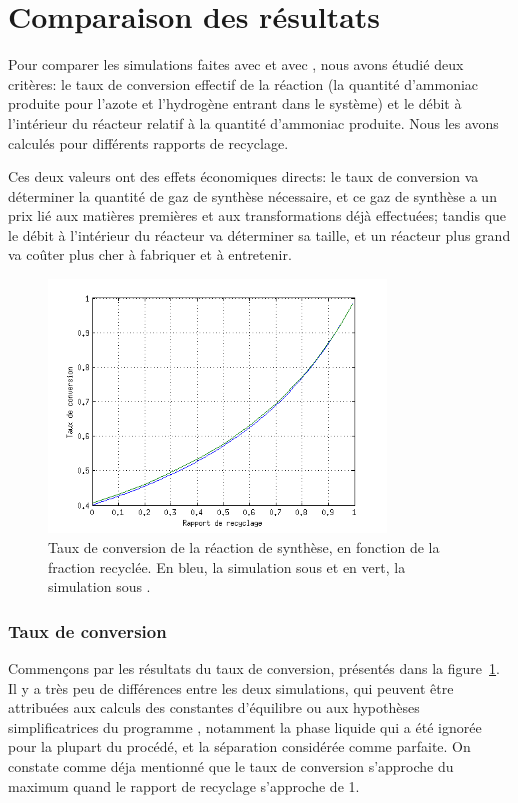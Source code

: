 \section{Comparaison des résultats}

Pour comparer les simulations faites avec \matlab{} et avec \aspen{},
nous avons étudié deux critères:
le taux de conversion effectif de la réaction (la quantité d'ammoniac
produite pour l'azote et l'hydrogène entrant dans le système)
et le débit à l'intérieur du réacteur relatif à la quantité d'ammoniac
produite.
Nous les avons calculés pour différents rapports de recyclage.

Ces deux valeurs ont des effets économiques directs:
le taux de conversion va déterminer la quantité de gaz de synthèse nécessaire,
et ce gaz de synthèse a un prix lié aux matières premières et aux
transformations déjà effectuées;
tandis que le débit à l'intérieur du réacteur va déterminer sa taille,
et un réacteur plus grand va coûter plus cher à fabriquer et à entretenir.

\begin{figure}
    \centering
    \includegraphics[width=0.8\textwidth]{img/yield}
    \caption{
        Taux de conversion de la réaction de synthèse,
        en fonction de la fraction recyclée.
        En bleu, la simulation sous \matlab{} et en vert,
        la simulation sous \aspen{}.
    }
    \label{fig:yield}
\end{figure}

\subsubsection{Taux de conversion}

Commençons par les résultats du taux de conversion, présentés dans la
figure~\ref{fig:yield}.
Il y a très peu de différences entre les deux simulations,
qui peuvent être attribuées aux calculs des constantes d'équilibre
ou aux hypothèses simplificatrices du programme \matlab{}, notamment
la phase liquide qui a été ignorée pour la plupart du procédé,
et la séparation considérée comme parfaite.
On constate comme déja mentionné que le taux de conversion s'approche
du maximum quand le rapport de recyclage s'approche de 1.

